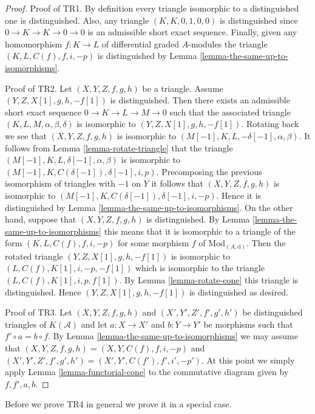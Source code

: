 \begin{proof}
Proof of TR1. By definition every triangle isomorphic to a distinguished
one is distinguished. Also, any triangle $(K, K, 0, 1, 0, 0)$
is distinguished since $0 \to K \to K \to 0 \to 0$ is
an admissible short exact sequence. Finally, given any homomorphism
$f : K \to L$ of differential graded $A$-modules the triangle
$(K, L, C(f), f, i, -p)$ is distinguished by
Lemma \ref{lemma-the-same-up-to-isomorphisms}.

\medskip\noindent
Proof of TR2. Let $(X, Y, Z, f, g, h)$ be a triangle.
Assume $(Y, Z, X[1], g, h, -f[1])$ is distinguished.
Then there exists an admissible short exact sequence
$0 \to K \to L \to M \to 0$ such that the associated
triangle $(K, L, M, \alpha, \beta, \delta)$
is isomorphic to $(Y, Z, X[1], g, h, -f[1])$. Rotating back we see
that $(X, Y, Z, f, g, h)$ is isomorphic to
$(M[-1], K, L, -\delta[-1], \alpha, \beta)$.
It follows from Lemma \ref{lemma-rotate-triangle} that the triangle
$(M[-1], K, L, \delta[-1], \alpha, \beta)$
is isomorphic to
$(M[-1], K, C(\delta[-1]), \delta[-1], i, p)$.
Precomposing the previous isomorphism of triangles with $-1$ on $Y$
it follows that $(X, Y, Z, f, g, h)$ is isomorphic to
$(M[-1], K, C(\delta[-1]), \delta[-1], i, -p)$.
Hence it is distinguished by
Lemma \ref{lemma-the-same-up-to-isomorphisms}.
On the other hand, suppose that $(X, Y, Z, f, g, h)$ is distinguished.
By Lemma \ref{lemma-the-same-up-to-isomorphisms} this means that it is
isomorphic to a triangle of the form
$(K, L, C(f), f, i, -p)$ for some morphism $f$ of
$\text{Mod}_{(A, \text{d})}$. Then the rotated triangle
$(Y, Z, X[1], g, h, -f[1])$ is
isomorphic to $(L, C(f), K[1], i, -p, -f[1])$ which is
isomorphic to the triangle
$(L, C(f), K[1], i, p, f[1])$.
By Lemma \ref{lemma-rotate-cone} this triangle is distinguished.
Hence $(Y, Z, X[1], g, h, -f[1])$ is distinguished as desired.

\medskip\noindent
Proof of TR3. Let $(X, Y, Z, f, g, h)$ and $(X', Y', Z', f', g', h')$
be distinguished triangles of $K(\mathcal{A})$ and let $a : X \to X'$
and $b : Y \to Y'$ be morphisms such that $f' \circ a = b \circ f$. By
Lemma \ref{lemma-the-same-up-to-isomorphisms} we may assume that
$(X, Y, Z, f, g, h) = (X, Y, C(f), f, i, -p)$ and
$(X', Y', Z', f', g', h') = (X', Y', C(f'), f', i', -p')$.
At this point we simply apply Lemma \ref{lemma-functorial-cone}
to the commutative diagram given by $f, f', a, b$.
\end{proof}

\noindent
Before we prove TR4 in general we prove it in a special case.

